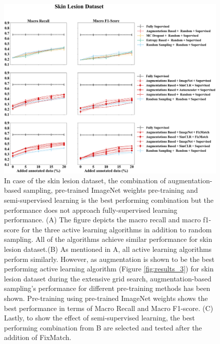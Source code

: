\begin{figure}[htbp]
\centering
\captionsetup{format=plain}
\includegraphics[width=\textwidth]{figures/fig_2_skin_recall_f1.png}
\caption{In case of the skin lesion dataset, the combination of augmentation-based sampling, pre-trained ImageNet weights pre-training and semi-supervised learning is the best performing combination but the performance does not approach fully-supervised learning performance. (A) The figure depicts the macro recall and macro f1-score for the three active learning algorithms in addition to random sampling. All of the algorithms achieve similar performance for skin lesion dataset.(B) As mentioned in A, all active learning algorithms perform similarly. However, as augmentation is shown to be the best performing active learning algorithm (Figure \ref{fig:results_3}) for skin lesion dataset during the extensive grid search, augmentation-based sampling's  performance for different pre-training methods has been shown. Pre-training using pre-trained ImageNet weights shows the best performance in terms of Macro Recall and Macro F1-score. (C) Lastly, to show the effect of semi-supervised learning, the best performing combination from B are selected and tested after the addition of FixMatch.}
\label{fig:fig_2_skin_recall_f1}
\end{figure}

